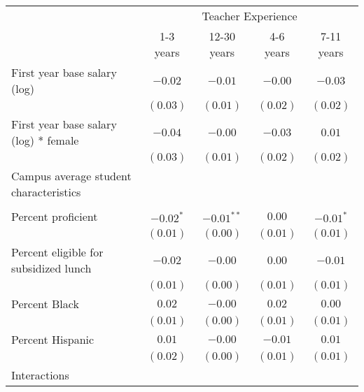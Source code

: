 \documentclass[]{article}
\begin{document}
\begin{table}
\begin{center}
\begin{tabular}{l c c c c }
\hline
 & \multicolumn{4}{c}{Teacher Experience} \\ \cline{2-5}
 & 1-3 years & 12-30 years & 4-6 years & 7-11 years \\
\hline
First year base salary (log)                & $-0.02$      & $-0.01$      & $-0.00$      & $-0.03$       \\
                                            & $(0.03)$     & $(0.01)$     & $(0.02)$     & $(0.02)$      \\
First year base salary (log) * female       & $-0.04$      & $-0.00$      & $-0.03$      & $0.01$        \\
                                            & $(0.03)$     & $(0.01)$     & $(0.02)$     & $(0.02)$      \\
Campus average student characteristics      &              &              &              &               \\
                                            &              &              &              &               \\
\quad Percent proficient                    & $-0.02^{*}$  & $-0.01^{**}$ & $0.00$       & $-0.01^{*}$   \\
                                            & $(0.01)$     & $(0.00)$     & $(0.01)$     & $(0.01)$      \\
\quad Percent eligible for subsidized lunch & $-0.02$      & $-0.00$      & $0.00$       & $-0.01$       \\
                                            & $(0.01)$     & $(0.00)$     & $(0.01)$     & $(0.01)$      \\
\quad Percent Black                         & $0.02$       & $-0.00$      & $0.02$       & $0.00$        \\
                                            & $(0.01)$     & $(0.00)$     & $(0.01)$     & $(0.01)$      \\
\quad Percent Hispanic                      & $0.01$       & $-0.00$      & $-0.01$      & $0.01$        \\
                                            & $(0.02)$     & $(0.00)$     & $(0.01)$     & $(0.01)$      \\
Interactions                                &              &              &              &               \\

\end{tabular}
\end{center}
\end{table}
\end{document}
